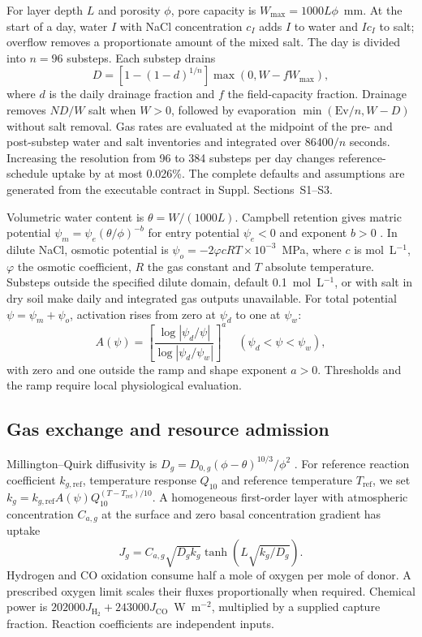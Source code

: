 \documentclass[11pt,a4paper]{article}
\begin{document}
For layer depth $L$ and porosity $\phi$, pore capacity is $W_{\max}=1000L\phi$~mm. At the start of a day, water $I$ with NaCl concentration $c_I$ adds $I$ to water and $Ic_I$ to salt; overflow removes a proportionate amount of the mixed salt. The day is divided into $n=96$ substeps. Each substep drains
\begin{equation}
D=\left[1-(1-d)^{1/n}\right]\max(0,W-fW_{\max}),
\end{equation}
where $d$ is the daily drainage fraction and $f$ the field-capacity fraction. Drainage removes $ND/W$ salt when $W>0$, followed by evaporation $\min(\mathrm{Ev}/n,W-D)$ without salt removal. Gas rates are evaluated at the midpoint of the pre- and post-substep water and salt inventories and integrated over $86400/n$ seconds. Increasing the resolution from 96 to 384 substeps per day changes reference-schedule uptake by at most 0.026\%. The complete defaults and assumptions are generated from the executable contract in Suppl. Sections~S1--S3.

Volumetric water content is $\theta=W/(1000L)$. Campbell retention gives matric potential $\psi_m=\psi_e(\theta/\phi)^{-b}$ for entry potential $\psi_e<0$ and exponent $b>0$ \cite{campbell1974retention}. In dilute NaCl, osmotic potential is $\psi_o=-2\varphi cRT\times10^{-3}$~MPa, where $c$ is mol~L$^{-1}$, $\varphi$ the osmotic coefficient, $R$ the gas constant and $T$ absolute temperature. Substeps outside the specified dilute domain, default 0.1~mol~L$^{-1}$, or with salt in dry soil make daily and integrated gas outputs unavailable. For total potential $\psi=\psi_m+\psi_o$, activation rises from zero at $\psi_d$ to one at $\psi_w$:
\begin{equation}
A(\psi)=\left[\frac{\log|\psi_d/\psi|}{\log|\psi_d/\psi_w|}\right]^a
\quad(\psi_d<\psi<\psi_w),
\end{equation}
with zero and one outside the ramp and shape exponent $a>0$. Thresholds and the ramp require local physiological evaluation.

\subsection{Gas exchange and resource admission}
Millington--Quirk diffusivity is $D_g=D_{0,g}(\phi-\theta)^{10/3}/\phi^2$ \cite{millington1961permeability}. For reference reaction coefficient $k_{g,\mathrm{ref}}$, temperature response $Q_{10}$ and reference temperature $T_{\mathrm{ref}}$, we set $k_g=k_{g,\mathrm{ref}}A(\psi)\allowbreak Q_{10}^{(T-T_{\mathrm{ref}})/10}$. A homogeneous first-order layer with atmospheric concentration $C_{a,g}$ at the surface and zero basal concentration gradient has uptake
\begin{equation}
J_g=C_{a,g}\sqrt{D_gk_g}\tanh\left(L\sqrt{k_g/D_g}\right).
\end{equation}
Hydrogen and CO oxidation consume half a mole of oxygen per mole of donor. A prescribed oxygen limit scales their fluxes proportionally when required. Chemical power is $202000J_{\mathrm{H_2}}+243000J_{\mathrm{CO}}$~W~m$^{-2}$, multiplied by a supplied capture fraction. Reaction coefficients are independent inputs.
\end{document}
